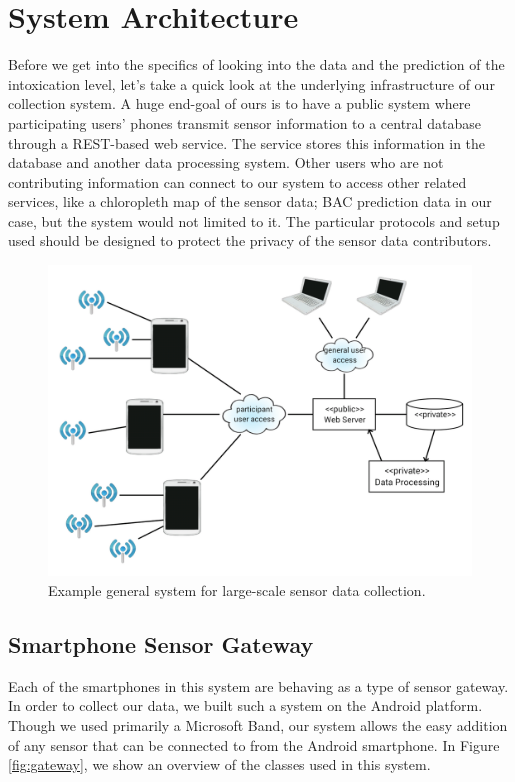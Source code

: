 \section{System Architecture}

Before we get into the specifics of looking into the data and the prediction of the intoxication level, let's take a quick look at the underlying infrastructure of our collection system. A huge end-goal of ours is to have a public system where participating users' phones transmit sensor information to a central database through a REST-based web service. The service stores this information in the database and another data processing system. Other users who are not contributing information can connect to our system to access other related services, like a chloropleth map of the sensor data; BAC prediction data in our case, but the system would not limited to it. The particular protocols and setup used should be designed to protect the privacy of the sensor data contributors.

\begin{figure}
	\includegraphics[width=1.0\textwidth]{../figs/system}
	\caption{Example general system for large-scale sensor data collection.}
	\label{fig:system}
\end{figure}

\subsection{Smartphone Sensor Gateway}

Each of the smartphones in this system are behaving as a type of sensor gateway. In order to collect our data, we built such a system on the Android platform. Though we used primarily a Microsoft Band, our system allows the easy addition of any sensor that can be connected to from the Android smartphone. In Figure \ref{fig:gateway}, we show an overview of the classes used in this system.

